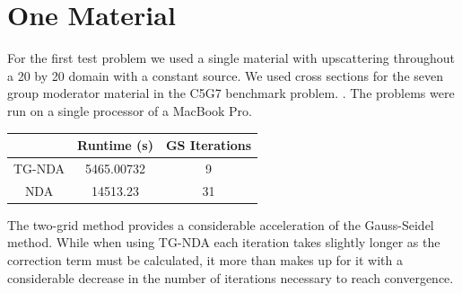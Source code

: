 \section{One Material}
For the first test problem we used a single material with  upscattering throughout a 20 by 20 domain with a constant source. We used cross sections for the seven group moderator material in the C5G7 benchmark problem. \cite{C5G7}.  
The problems were run on a single processor of a MacBook Pro. 
\begin{center}
    \begin{tabular}{|c|c|c|}
    \hline
    & Runtime (s) & GS Iterations \\
    \hline
    TG-NDA & 5465.00732 & 9 \\
    NDA & 14513.23 & 31 \\
    \hline
    \end{tabular}
\end{center}
The two-grid method provides a considerable acceleration of the Gauss-Seidel method. While when using TG-NDA each iteration takes slightly longer as the correction term must be calculated, it more than makes up for it with a considerable decrease in the number of iterations necessary to reach convergence. 

